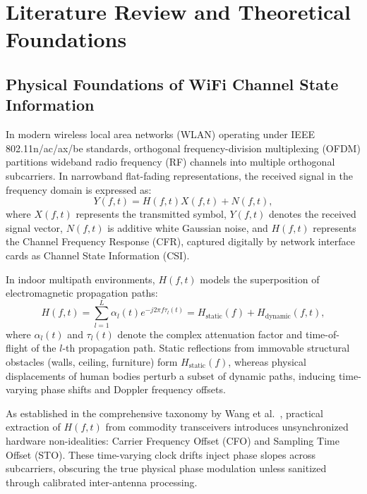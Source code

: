 \chapter{Literature Review and Theoretical Foundations}

\section{Physical Foundations of WiFi Channel State Information}
In modern wireless local area networks (WLAN) operating under IEEE 802.11n/ac/ax/be standards, orthogonal frequency-division multiplexing (OFDM) partitions wideband radio frequency (RF) channels into multiple orthogonal subcarriers. In narrowband flat-fading representations, the received signal in the frequency domain is expressed as:
\begin{equation}
    Y(f, t) = H(f, t) X(f, t) + N(f, t),
\end{equation}
where $X(f, t)$ represents the transmitted symbol, $Y(f, t)$ denotes the received signal vector, $N(f, t)$ is additive white Gaussian noise, and $H(f, t)$ represents the Channel Frequency Response (CFR), captured digitally by network interface cards as Channel State Information (CSI).

In indoor multipath environments, $H(f, t)$ models the superposition of electromagnetic propagation paths:
\begin{equation}
    H(f, t) = \sum_{l=1}^{L} \alpha_l(t) e^{-j 2\pi f \tau_l(t)} = H_{\text{static}}(f) + H_{\text{dynamic}}(f, t),
\end{equation}
where $\alpha_l(t)$ and $\tau_l(t)$ denote the complex attenuation factor and time-of-flight of the $l$-th propagation path. Static reflections from immovable structural obstacles (walls, ceiling, furniture) form $H_{\text{static}}(f)$, whereas physical displacements of human bodies perturb a subset of dynamic paths, inducing time-varying phase shifts and Doppler frequency offsets.

As established in the comprehensive taxonomy by Wang et al.~\cite{author2025a}, practical extraction of $H(f, t)$ from commodity transceivers introduces unsynchronized hardware non-idealities: Carrier Frequency Offset (CFO) and Sampling Time Offset (STO). These time-varying clock drifts inject phase slopes across subcarriers, obscuring the true physical phase modulation unless sanitized through calibrated inter-antenna processing.

